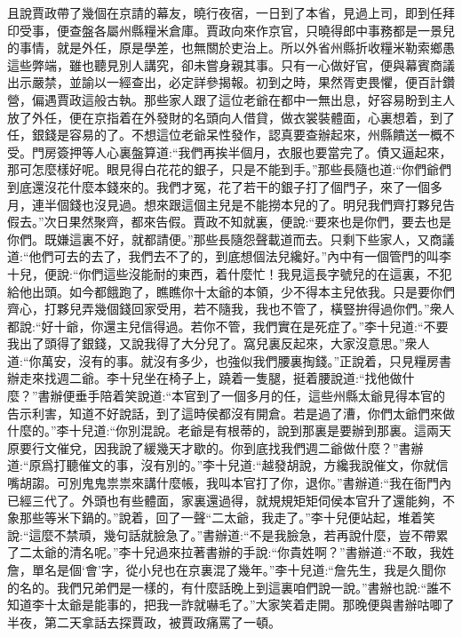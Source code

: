 \begin{parag}
    且說賈政帶了幾個在京請的幕友，曉行夜宿，一日到了本省，見過上司，即到任拜印受事，便查盤各屬州縣糧米倉庫。賈政向來作京官，只曉得郎中事務都是一景兒的事情，就是外任，原是學差，也無關於吏治上。所以外省州縣折收糧米勒索鄉愚這些弊端，雖也聽見別人講究，卻未嘗身親其事。只有一心做好官，便與幕賓商議出示嚴禁，並諭以一經查出，必定詳參揭報。初到之時，果然胥吏畏懼，便百計鑽營，偏遇賈政這般古執。那些家人跟了這位老爺在都中一無出息，好容易盼到主人放了外任，便在京指着在外發財的名頭向人借貸，做衣裳裝體面，心裏想着，到了任，銀錢是容易的了。不想這位老爺呆性發作，認真要查辦起來，州縣饋送一概不受。門房簽押等人心裏盤算道:“我們再挨半個月，衣服也要當完了。債又逼起來，那可怎麼樣好呢。眼見得白花花的銀子，只是不能到手。”那些長隨也道:“你們爺們到底還沒花什麼本錢來的。我們才冤，花了若干的銀子打了個門子，來了一個多月，連半個錢也沒見過。想來跟這個主兒是不能撈本兒的了。明兒我們齊打夥兒告假去。”次日果然聚齊，都來告假。賈政不知就裏，便說:“要來也是你們，要去也是你們。既嫌這裏不好，就都請便。”那些長隨怨聲載道而去。只剩下些家人，又商議道:“他們可去的去了，我們去不了的，到底想個法兒纔好。”內中有一個管門的叫李十兒，便說:“你們這些沒能耐的東西，着什麼忙！我見這長字號兒的在這裏，不犯給他出頭。如今都餓跑了，瞧瞧你十太爺的本領，少不得本主兒依我。只是要你們齊心，打夥兒弄幾個錢回家受用，若不隨我，我也不管了，橫豎拚得過你們。”衆人都說:“好十爺，你還主兒信得過。若你不管，我們實在是死症了。”李十兒道:“不要我出了頭得了銀錢，又說我得了大分兒了。窩兒裏反起來，大家沒意思。”衆人道:“你萬安，沒有的事。就沒有多少，也強似我們腰裏掏錢。”正說着，只見糧房書辦走來找週二爺。李十兒坐在椅子上，蹺着一隻腿，挺着腰說道:“找他做什麼？”書辦便垂手陪着笑說道:“本官到了一個多月的任，這些州縣太爺見得本官的告示利害，知道不好說話，到了這時侯都沒有開倉。若是過了漕，你們太爺們來做什麼的。”李十兒道:“你別混說。老爺是有根蒂的，說到那裏是要辦到那裏。這兩天原要行文催兌，因我說了緩幾天才歇的。你到底找我們週二爺做什麼？”書辦道:“原爲打聽催文的事，沒有別的。”李十兒道:“越發胡說，方纔我說催文，你就信嘴胡謅。可別鬼鬼祟祟來講什麼帳，我叫本官打了你，退你。”書辦道:“我在衙門內已經三代了。外頭也有些體面，家裏還過得，就規規矩矩伺侯本官升了還能夠，不象那些等米下鍋的。”說着，回了一聲“二太爺，我走了。”李十兒便站起，堆着笑說:“這麼不禁頑，幾句話就臉急了。”書辦道:“不是我臉急，若再說什麼，豈不帶累了二太爺的清名呢。”李十兒過來拉著書辦的手說:“你貴姓啊？”書辦道:“不敢，我姓詹，單名是個‘會’字，從小兒也在京裏混了幾年。”李十兒道:“詹先生，我是久聞你的名的。我們兄弟們是一樣的，有什麼話晚上到這裏咱們說一說。”書辦也說:“誰不知道李十太爺是能事的，把我一詐就嚇毛了。”大家笑着走開。那晚便與書辦咕唧了半夜，第二天拿話去探賈政，被賈政痛罵了一頓。
\end{parag}


